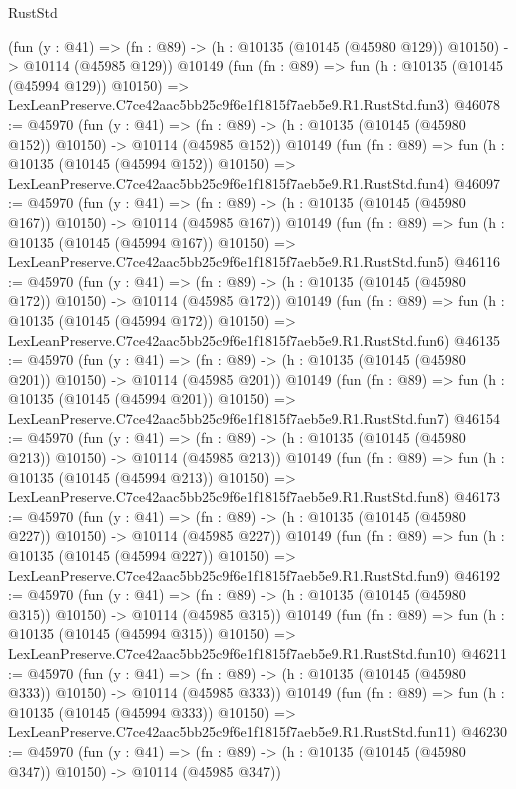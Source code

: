 \begin{lexlean}{RustStd}
\begin{coremodule}
    (fun (y : @41) =>
    (fn : @89) -> (h : @10135 (@10145 (@45980 @129)) @10150) -> @10114 (@45985 @129))
    @10149
    (fun (fn : @89) =>
    fun (h : @10135 (@10145 (@45994 @129)) @10150) =>
    LexLeanPreserve.C7ce42aac5bb25c9f6e1f1815f7aeb5e9.R1.RustStd.fun3)
@46078 := @45970
    (fun (y : @41) =>
    (fn : @89) -> (h : @10135 (@10145 (@45980 @152)) @10150) -> @10114 (@45985 @152))
    @10149
    (fun (fn : @89) =>
    fun (h : @10135 (@10145 (@45994 @152)) @10150) =>
    LexLeanPreserve.C7ce42aac5bb25c9f6e1f1815f7aeb5e9.R1.RustStd.fun4)
@46097 := @45970
    (fun (y : @41) =>
    (fn : @89) -> (h : @10135 (@10145 (@45980 @167)) @10150) -> @10114 (@45985 @167))
    @10149
    (fun (fn : @89) =>
    fun (h : @10135 (@10145 (@45994 @167)) @10150) =>
    LexLeanPreserve.C7ce42aac5bb25c9f6e1f1815f7aeb5e9.R1.RustStd.fun5)
@46116 := @45970
    (fun (y : @41) =>
    (fn : @89) -> (h : @10135 (@10145 (@45980 @172)) @10150) -> @10114 (@45985 @172))
    @10149
    (fun (fn : @89) =>
    fun (h : @10135 (@10145 (@45994 @172)) @10150) =>
    LexLeanPreserve.C7ce42aac5bb25c9f6e1f1815f7aeb5e9.R1.RustStd.fun6)
@46135 := @45970
    (fun (y : @41) =>
    (fn : @89) -> (h : @10135 (@10145 (@45980 @201)) @10150) -> @10114 (@45985 @201))
    @10149
    (fun (fn : @89) =>
    fun (h : @10135 (@10145 (@45994 @201)) @10150) =>
    LexLeanPreserve.C7ce42aac5bb25c9f6e1f1815f7aeb5e9.R1.RustStd.fun7)
@46154 := @45970
    (fun (y : @41) =>
    (fn : @89) -> (h : @10135 (@10145 (@45980 @213)) @10150) -> @10114 (@45985 @213))
    @10149
    (fun (fn : @89) =>
    fun (h : @10135 (@10145 (@45994 @213)) @10150) =>
    LexLeanPreserve.C7ce42aac5bb25c9f6e1f1815f7aeb5e9.R1.RustStd.fun8)
@46173 := @45970
    (fun (y : @41) =>
    (fn : @89) -> (h : @10135 (@10145 (@45980 @227)) @10150) -> @10114 (@45985 @227))
    @10149
    (fun (fn : @89) =>
    fun (h : @10135 (@10145 (@45994 @227)) @10150) =>
    LexLeanPreserve.C7ce42aac5bb25c9f6e1f1815f7aeb5e9.R1.RustStd.fun9)
@46192 := @45970
    (fun (y : @41) =>
    (fn : @89) -> (h : @10135 (@10145 (@45980 @315)) @10150) -> @10114 (@45985 @315))
    @10149
    (fun (fn : @89) =>
    fun (h : @10135 (@10145 (@45994 @315)) @10150) =>
    LexLeanPreserve.C7ce42aac5bb25c9f6e1f1815f7aeb5e9.R1.RustStd.fun10)
@46211 := @45970
    (fun (y : @41) =>
    (fn : @89) -> (h : @10135 (@10145 (@45980 @333)) @10150) -> @10114 (@45985 @333))
    @10149
    (fun (fn : @89) =>
    fun (h : @10135 (@10145 (@45994 @333)) @10150) =>
    LexLeanPreserve.C7ce42aac5bb25c9f6e1f1815f7aeb5e9.R1.RustStd.fun11)
@46230 := @45970
    (fun (y : @41) =>
    (fn : @89) -> (h : @10135 (@10145 (@45980 @347)) @10150) -> @10114 (@45985 @347))

\end{coremodule}
\end{lexlean}
